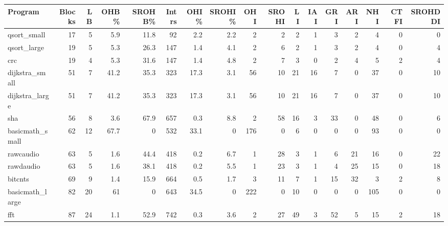 \begin{tabular}{lrrrrrrrrrrrrrrrr}
\hline
 Program         &   Blocks &   LB &   OHB\% &   SROHB\% &   Intrs &   OHI\% &   SROHI\% &   OHI &   SROHI &   LI &   IAI &   GRI &   ARI &   NHI &   CTFI &   SROHDDI \\
\hline
 qsort\_small     &       17 &    5 &    5.9 &     11.8 &      92 &    2.2 &      2.2 &     2 &       2 &    2 &     1 &     3 &     2 &     4 &      0 &         0 \\
 qsort\_large     &       19 &    5 &    5.3 &     26.3 &     147 &    1.4 &      4.1 &     2 &       6 &    2 &     1 &     3 &     2 &     4 &      0 &         4 \\
 crc             &       19 &    4 &    5.3 &     31.6 &     147 &    1.4 &      4.8 &     2 &       7 &    3 &     0 &     2 &     4 &     5 &      2 &         4 \\
 dijkstra\_small  &       51 &    7 &   41.2 &     35.3 &     323 &   17.3 &      3.1 &    56 &      10 &   21 &    16 &     7 &     0 &    37 &      0 &        10 \\
 dijkstra\_large  &       51 &    7 &   41.2 &     35.3 &     323 &   17.3 &      3.1 &    56 &      10 &   21 &    16 &     7 &     0 &    37 &      0 &        10 \\
 sha             &       56 &    8 &    3.6 &     67.9 &     657 &    0.3 &      8.8 &     2 &      58 &   16 &     3 &    33 &     0 &    48 &      0 &         6 \\
 basicmath\_small &       62 &   12 &   67.7 &      0   &     532 &   33.1 &      0   &   176 &       0 &    6 &     0 &     0 &     0 &    93 &      0 &         0 \\
 rawcaudio       &       63 &    5 &    1.6 &     44.4 &     418 &    0.2 &      6.7 &     1 &      28 &    3 &     1 &     6 &    21 &    16 &      0 &        22 \\
 rawdaudio       &       63 &    5 &    1.6 &     38.1 &     418 &    0.2 &      5.5 &     1 &      23 &    3 &     1 &     4 &    25 &    15 &      0 &        18 \\
 bitcnts         &       69 &    9 &    1.4 &     15.9 &     664 &    0.5 &      1.7 &     3 &      11 &    7 &     1 &    15 &    32 &     3 &      2 &         8 \\
 basicmath\_large &       82 &   20 &   61   &      0   &     643 &   34.5 &      0   &   222 &       0 &   10 &     0 &     0 &     0 &   105 &      0 &         0 \\
 fft             &       87 &   24 &    1.1 &     52.9 &     742 &    0.3 &      3.6 &     2 &      27 &   49 &     3 &    52 &     5 &    15 &      2 &        18 \\

\end{tabular}
